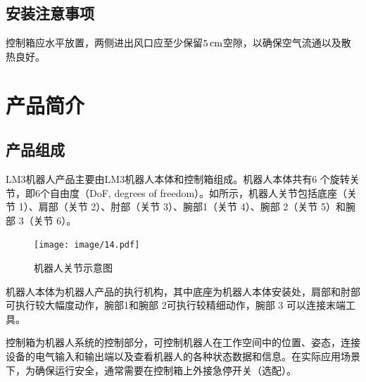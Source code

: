 
\subsection{安装注意事项}
控制箱应水平放置，两侧进出风口应至少保留$5 \,\mathrm{cm}$空隙，以确保空气流通以及散热良好。



\section{产品简介}

\subsection{产品组成}

LM3机器人产品主要由LM3机器人本体和控制箱组成。机器人本体共有6 个旋转关节，即6个自由度（DoF, degrees of freedom）。如所示，机器人关节包括底座（关节 1）、肩部（关节 2）、肘部（关节 3）、腕部1（关节 4）、腕部 2（关节 5）和腕部 3（关节 6）。

\begin{figure}[ht]
    \centering
    \texttt{[image: image/14.pdf]}
    \caption{机器人关节示意图}
    \label{fig:机器人关节示意图}
\end{figure}

机器人本体为机器人产品的执行机构，其中底座为机器人本体安装处，肩部和肘部可执行较大幅度动作，腕部1和腕部 2可执行较精细动作，腕部 3 可以连接末端工具。

控制箱为机器人系统的控制部分，可控制机器人在工作空间中的位置、姿态，连接设备的电气输入和输出端以及查看机器人的各种状态数据和信息。在实际应用场景下，为确保运行安全，通常需要在控制箱上外接急停开关（选配）。

